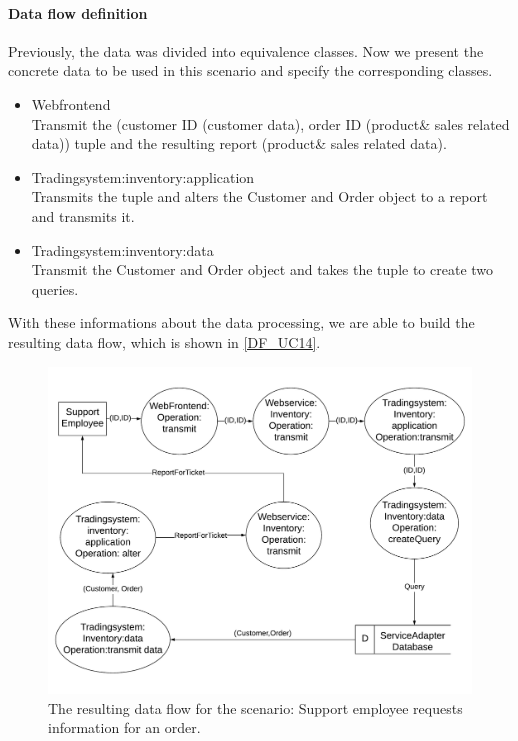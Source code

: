 \paragraph{Data flow definition}
Previously, the data was divided into equivalence classes.  Now we present the concrete data to be used in this scenario and specify the corresponding classes.\\
\begin{itemize}
\item Webfrontend\\ Transmit the (customer ID (customer data), order ID (product\& sales related data)) tuple and the resulting report (product\& sales related data).
\item Tradingsystem:inventory:application \\ Transmits the tuple and alters the Customer and Order object to a report and transmits it.
\item Tradingsystem:inventory:data \\ Transmit the Customer and Order object and takes the tuple to create two queries.
\end{itemize}
With these informations about the data processing, we are able to build the resulting data flow, which is shown in \autoref{DF_UC14}.

\begin{figure}
\includegraphics[scale=0.8, angle = 90]{logos/DF_UC14.pdf}
\caption{The resulting data flow for the scenario: Support employee requests information for an order.}
\label{DF_UC14}
\end{figure}
